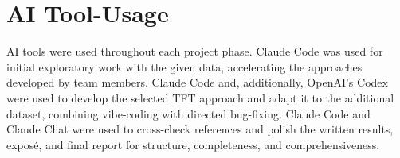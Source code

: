 \documentclass[11pt]{article}
\begin{document}
\section*{AI Tool-Usage}
AI tools were used throughout each project phase. Claude Code was used for initial exploratory
work with the given data, accelerating the approaches developed by team members. Claude Code and,
additionally, OpenAI's Codex were used to develop the selected TFT approach and adapt it to the
additional dataset, combining vibe-coding with directed bug-fixing. Claude Code and Claude Chat
were used to cross-check references and polish the written results, exposé, and final report for
structure, completeness, and comprehensiveness.


\printbibliography
\end{document}
